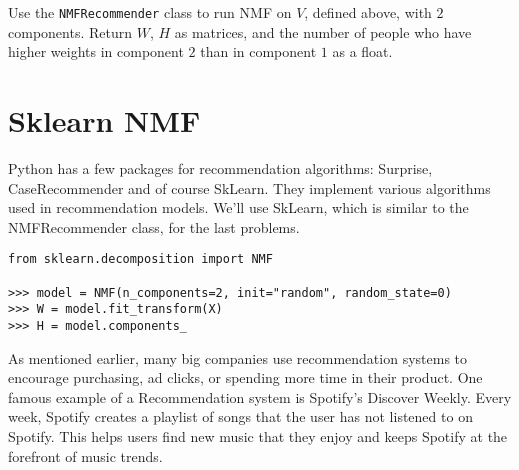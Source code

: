 \begin{problem}
Use the \texttt{NMFRecommender}  class to run NMF on $V$, defined above, with $2$ components.
Return $W$, $H$ as matrices, and the number of people who have higher weights in component $2$ than in component $1$ as a float.
\end{problem}

\section*{Sklearn NMF}
Python has a few packages for recommendation algorithms: Surprise, CaseRecommender and of course SkLearn.
They implement various algorithms used in recommendation models.
We'll use SkLearn, which is similar to the NMFRecommender class, for the last problems.


\begin{lstlisting}
from sklearn.decomposition import NMF

>>> model = NMF(n_components=2, init="random", random_state=0)
>>> W = model.fit_transform(X)
>>> H = model.components_
\end{lstlisting}

As mentioned earlier, many big companies use recommendation systems to encourage purchasing, ad clicks, or spending more time in their product.
One famous example of a Recommendation system is Spotify's Discover Weekly.
Every week, Spotify creates a playlist of songs that the user has not listened to on Spotify.
This helps users find new music that they enjoy and keeps Spotify at the forefront of music trends.

